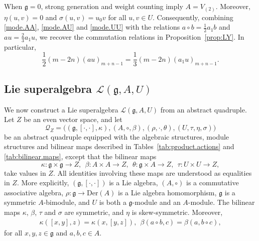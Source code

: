 \documentclass[12pt]{article}
\numberwithin{equation}{section}
\theoremstyle{definition}
\theoremstyle{plain}
\newcommand{\fg}{\mathfrak{g}}
\newcommand{\Der}{\mathrm{Der }}
\newcommand{\cQ}{\ensuremath{\mathcal{Q}}}
\newcommand{\cL}{\ensuremath{\mathcal{L}}}
\begin{document}
When $\fg=0$, strong generation and weight counting imply $A=V_{(2)}$. Moreover, $\eta(u,v)=0$ and $\sigma(u,v)=u_0v$ for all $u,v\in U$. Consequently, combining \eqref{mode.AA}, \eqref{mode.AU} and \eqref{mode.UU} with the relations $a\circ b=\frac12a_1b$ and $au=\frac23a_1u$, we recover the commutation relations in Proposition~\ref{prop:LY}. In particular,
\begin{equation*}
    \frac12(m-2n)(au)_{m+n-1}
    =\frac13(m-2n)(a_1u)_{m+n-1}.
\end{equation*}


\subsection{Lie superalgebra $\cL(\fg,A,U)$}\label{sect:Lie.salg}
\hspace{1.5em}We now construct a Lie superalgebra $\cL(\fg,A,U)$ from an abstract quadruple. Let $Z$ be an even vector space, and let
\begin{equation*}
    \cQ_Z=\Big((\fg,[\cdot,\cdot],\kappa),(A,\circ,\beta),
    (\rho,\cdot,\theta),(U,\tau,\eta,\sigma)\Big)
\end{equation*}
be an abstract quadruple equipped with the algebraic structures, module structures and bilinear maps described in Tables~\ref{tab:product.actions} and \ref{tab:bilinear.maps},
except that the bilinear maps
\begin{equation*}
    \kappa:\fg\times\fg\to Z,\ \ \beta:A\times A\to Z,\ \ \theta:\fg\times A\to Z,\ \ \tau:U\times U\to Z,
\end{equation*}
take values in $Z$. All identities involving these maps are understood as equalities in $Z$. More explicitly, $(\fg,[\cdot,\cdot])$ is a Lie algebra, $(A,\circ)$ is a commutative associative algebra, $\rho:\fg\to\Der(A)$ is a Lie algebra homomorphism, $\fg$ is a symmetric $A$-bimodule, and $U$ is both a $\fg$-module and an $A$-module. The bilinear maps $\kappa$, $\beta$, $\tau$ and $\sigma$ are symmetric, and $\eta$ is skew-symmetric. Moreover,
\begin{gather*}
    \kappa([x,y],z)=\kappa(x,[y,z]),\ \ \beta(a\circ b,c)=\beta(a,b\circ c),
\end{gather*}
for all $x,y,z\in\fg$ and $a,b,c\in A$.
\end{document}

